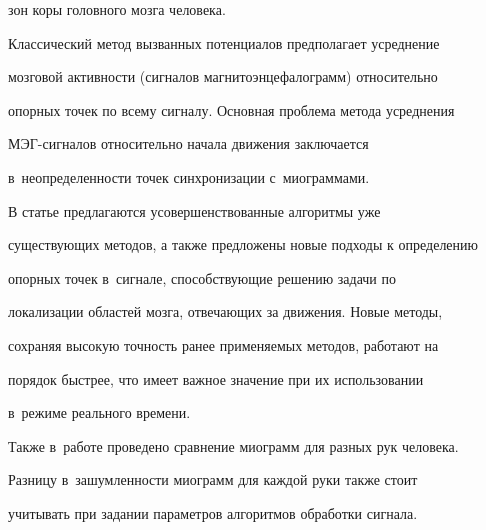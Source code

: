 зон коры головного мозга человека.



Классический метод вызванных потенциалов предполагает усреднение

мозговой активности (сигналов магнитоэнцефалограмм) относительно

опорных точек по всему сигналу. Основная проблема метода усреднения

МЭГ-сиг\-на\-лов относительно начала движения заключается 

в~неопределенности точек синхронизации с~миограммами.



В статье предлагаются  усовершенствованные алгоритмы уже

существующих методов, а также предложены новые подходы к определению

опорных точек в~сигнале, способствующие решению задачи по

локализации областей мозга, отвечающих за движения. Новые методы,

сохраняя высокую точность ранее применяемых методов, работают на

порядок быстрее, что имеет важное значение при их использовании 

в~режиме реального времени.



Также в~работе проведено сравнение миограмм для разных рук человека.

Разницу в~зашумленности миограмм для каждой руки также стоит

учитывать при задании параметров алгоритмов обработки сигнала.



